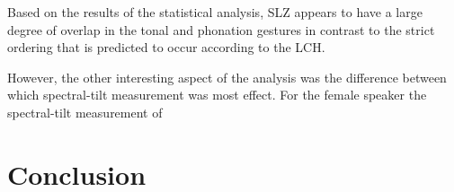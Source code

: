 \documentclass[12pt, letterpaper]{article}
\begin{document}
Based on the results of the statistical analysis, SLZ appears to have a large degree of overlap in the tonal and phonation gestures in contrast to the strict ordering that is predicted to occur according to the LCH. 

However, the other interesting aspect of the analysis was the difference between which spectral-tilt measurement was most effect. For the female speaker the spectral-tilt measurement of 


\section{Conclusion} \label{sec:Conclusion}


\printbibliography[heading=bibintoc]
\end{document}
